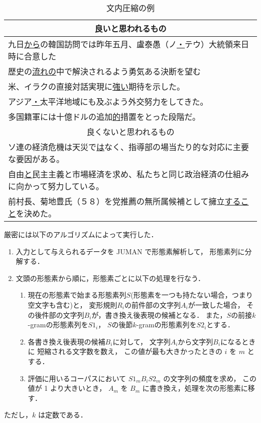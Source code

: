 \begin{table*}[t]
\small
  \begin{center}
    \leavevmode
    \caption{文内圧縮の例}
    \label{tab:compress_result}
\begin{tabular}{|l|}\hline
\multicolumn{1}{|c|}{良いと思われるもの}\\\hline
九日\underline{から}の韓国訪問では昨年五月、盧泰愚（ノ\underline{・}テウ）大統領来日時に合意した\\
歴史の\underline{流れの}中で解決されるよう勇気ある決断を望む\\
米、イラクの直接対話実現に\underline{強い}期待を示した。\\
アジア\underline{・}太平洋地域にも及ぶよう外交努力をしてきた。\\
多国籍軍には十億ドルの追加\underline{的}措置をとった段階だ。\\\hline
\multicolumn{1}{|c|}{良くないと思われるもの}\\\hline
ソ連の経済危機は天災で\underline{は}なく、指導部の場当たり的な対応に主要な要因がある。\\
自由\underline{と}民主主義と市場経済を求め、私たちと同じ政治経済の仕組みに向かって努力している。\\
前村長、菊地豊氏（５８）を党推薦の無所属候補として擁立\underline{すること}を決めた。\\\hline
\end{tabular}
\end{center}
\end{table*}


厳密には以下のアルゴリズムによって実行した．
\begin{enumerate}
\item 
  入力として与えられるデータを JUMAN\cite{JUMAN3.6} で形態素解析して，
  形態素列に分解する．

\item 
  \label{enum:proc1}
  文頭の形態素から順に，形態素ごとに以下の処理を行なう．

  \begin{enumerate}
  \item 
    現在の形態素で始まる形態素列$S$(形態素を一つも持たない場合，つまり
    空文字も含む)と，
    変形規則$R_i$の前件部の文字列$A_i$が一致した場合，
    その後件部の文字列$B_i$が，書き換え後表現の候補となる．
    また，$S$の前接$k$-gramの形態素列を$S1_i$，
    $S$の後節$k$-gramの形態素列を$S2_i$とする．

  \item 
    各書き換え後表現の候補$B_i$に対して，
    文字列$A_i$から文字列$B_i$になるときに
    短縮される文字数を数え，
    この値が最も大きかったときの $i$ を $m$ とする．
  
  \item 
    評価に用いるコーパスにおいて
    $S1_m$$B_i$$S2_m$ の文字列の頻度を求め，
    この値が 1 より大きいとき，
    $A_m$ を $B_m$ に書き換え，処理を次の形態素に移す．
  \end{enumerate}
\end{enumerate}
ただし，$k$ は定数である．

